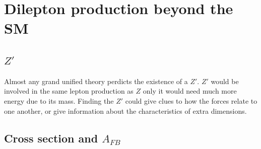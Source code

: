 \documentclass{article}
\begin{document}
\section{Dilepton production beyond the SM}

\subsection{$Z'$}
Almost any grand unified theory perdicts the existence of a $Z'$. $Z'$ would be
involved in the same lepton production as $Z$ only it would need much more
energy due to its mass.
Finding the $Z'$ could give clues to how the forces relate to one another, or give
information about the characteristics of extra dimensions.

\subsection{Cross section and $A_{FB}$}
\end{document}
